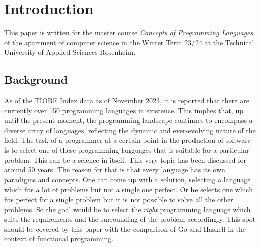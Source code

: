 \chapter{Introduction}\label{chap:introduction}
This paper is written for the master course \textit{Concepts of Programming Languages} of the apartment of computer science in the Winter Term 23/24 at the Technical University of Applied Sciences Rosenheim.
    \section{Background}\label{sec:background}
As of the TIOBE Index data as of November 2023, it is reported that there are currently over 150 programming languages in existence. This implies that, up until the present moment, the programming landscape continues to encompass a diverse array of languages, reflecting the dynamic and ever-evolving nature of the field.\cite{tiobeindex} The task of a programmer at a certain point in the production of software is to select one of these programming languages that is suitable for a particular problem. This can be a science in itself. This very topic has been discussed for around 50 years.\cite{Tharp1982}
The reason for that is that every language has its own paradigms and concepts. One can come up with a solution, selecting a language which fits a lot of problems but not a single one perfect. Or he selects one which fits perfect for a single problem but it is not possible to solve all the other problems.
So the goal would be to select the \textit{right} programming language which suits the requirements and the surrounding of the problem accordingly.
This spot should be covered by this paper with the comparison of Go and Haskell in the context of functional programming.


